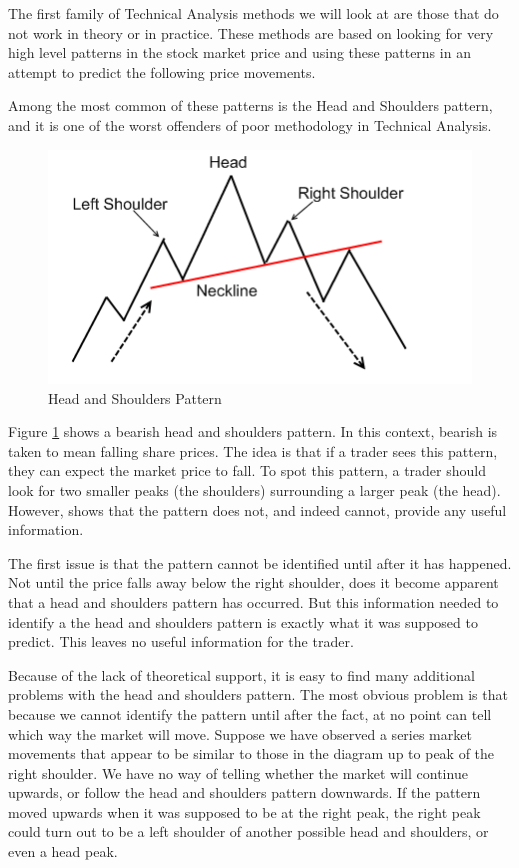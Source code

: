 \documentclass{report}
\begin{document}
The first family of Technical Analysis methods we will look at are those that do not work in theory or in practice. These methods are based on looking for very high level patterns in the stock market price and using these patterns in an attempt to predict the following price movements.

Among the most common of these patterns is the Head and Shoulders pattern, and it is one of the worst offenders of poor methodology in Technical Analysis.

\begin{figure}[H]
	\caption{Head and Shoulders Pattern \cite{website:headshoulders}}
	\centerline{\includegraphics[width=\textwidth]{vis/headshoulders.png}}
	\label{fig:headshoulders}
\end{figure}

Figure \ref{fig:headshoulders} shows a bearish head and shoulders pattern. In this context, bearish is taken to mean falling share prices. The idea is that if a trader sees this pattern, they can expect the market price to fall. To spot this pattern, a trader should look for two smaller peaks (the shoulders) surrounding a larger peak (the head). However, \citet{neftci1991naive} shows that the pattern does not, and indeed cannot, provide any useful information. 

The first issue is that the pattern cannot be identified until after it has happened. Not until the price falls away below the right shoulder, does it become apparent that a head and shoulders pattern has occurred. But this information needed to identify a the head and shoulders pattern is exactly what it was supposed to predict. This leaves no useful information for the trader. 

Because of the lack of theoretical support, it is easy to find many additional problems with the head and shoulders pattern. The most obvious problem is that because we cannot identify the pattern until after the fact, at no point can tell which way the market will move. Suppose we have observed a series market movements that appear to be similar to those in the diagram up to peak of the right shoulder. We have no way of telling whether the market will continue upwards, or follow the head and shoulders pattern downwards. If the pattern moved upwards when it was supposed to be at the right peak, the right peak could turn out to be a left shoulder of another possible head and shoulders, or even a head peak.
\end{document}
